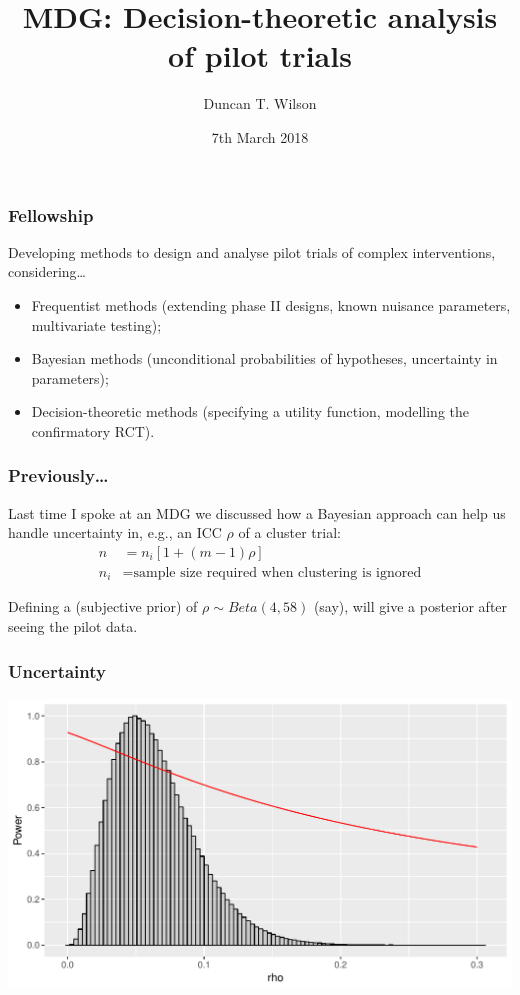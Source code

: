 \documentclass{beamer}
\title{MDG: Decision-theoretic analysis of pilot trials}
\author{Duncan T. Wilson}
\institute[LICTR] %
{
\texttt{[image: U:/Misc/Logos/LICTR\_logo]}\\
Clinical Trials Research Unit \\ %
Leeds Institute of Clinical Trials Research \\
University of Leeds \\
\medskip
\textit{d.t.wilson@leeds.ac.uk} %
}
\date{7th March 2018}
\begin{document}
\begin{frame}
\titlepage %
\end{frame}



\begin{frame}
\frametitle{Fellowship}
\centering
Developing methods to design and analyse pilot trials of complex interventions, considering\ldots
\begin{itemize}
\item Frequentist methods (extending phase II designs, known nuisance parameters, multivariate testing);
\item Bayesian methods (unconditional probabilities of hypotheses, uncertainty in parameters);
\item Decision-theoretic methods (specifying a utility function, modelling the confirmatory RCT).
\end{itemize}
\end{frame}

\begin{frame}
\frametitle{Previously\ldots}
Last time I spoke at an MDG we discussed how a Bayesian approach can help us handle uncertainty in, e.g., an ICC $\rho$ of a cluster trial:
\begin{align*}
n &= n_{i}[1+(m-1)\rho] \\
n_{i} &= \text{sample size required when clustering is ignored}
\end{align*}

Defining a (subjective prior) of $\rho \sim Beta(4, 58)$ (say), will give a posterior after seeing the pilot data.
\end{frame}

\begin{frame}
\frametitle{Uncertainty}
\vspace{3mm}
\centering
\includegraphics[scale=0.45]{prior_ICC}
\end{frame}
\end{document}

